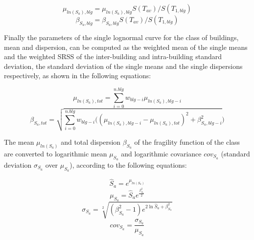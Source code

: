 \begin{equation}
\mu_{ln(S_a), blg} = \mu_{ln(S_a), blg} S(T_{av})/ S(T_{1, blg})
\end{equation}
\begin{equation}
\beta_{S_a, blg} = \beta_{S_a, blg} S(T_{av})/ S(T_{1, blg})
\label{eq:Sa(Tav)}
\end{equation}

Finally the parameters of the single lognormal curve for the class of buildings, mean and dispersion, can be computed as the weighted mean of the single means and the weighted SRSS of the inter-building and intra-building standard deviation, the standard deviation of the single means and the single dispersions respectively, as shown in the following equations:

\begin{equation}
\mu_{ln(S_a), tot} = \sum_{i=0}^{n.blg} w_{blg-i} \mu_{ln(S_a), blg-i}
\label{eq:combination-lognormals-mu}
\end{equation}
\begin{equation}
\beta_{S_a, tot} = \sqrt{ \sum_{i=0}^{n.blg} w_{blg-i} ((\mu_{ln(S_a), blg-i}-\mu_{ln(S_a), tot})^2+ \beta_{S_a, blg-i}^2})
\label{eq:combination-lognormals-sigma}
\end{equation}

The mean $\mu_{ln(S_a)}$ and total dispersion $\beta_{S_a}$ of the fragility function of the class are converted to logarithmic mean $\mu_{S_a}$ and logarithmic covariance $cov_{S_a}$ (standard deviation $\sigma_{S_a}$ over $\mu_{S_a}$), according to the following equations:

\begin{equation}
\hat{S}_a = e^{\mu_{ln(S_a)}}
\end{equation}
\begin{equation}
\mu_{S_a} = \hat{S}_a e^{\frac{\beta_{S_a}^2}{2}}
\label{eq:median-to-mean}
\end{equation}
\begin{equation}
\sigma_{S_a} = \sqrt[2]{(\beta_{S_a}^2-1) e^{2\ln{ \hat{S}_a}+\beta_{S_a}^2}}
\label{eq:dispersion-to-standard}
\end{equation}
\begin{equation}
cov_{S_a} = \frac{\sigma_{S_a}}{\mu_{S_a} }
\end{equation}